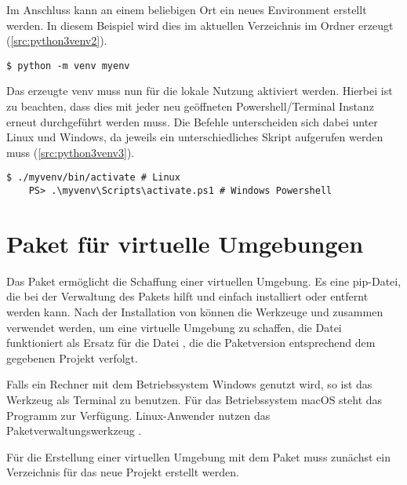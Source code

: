 Im Anschluss kann an einem beliebigen Ort ein neues Environment erstellt werden. In diesem Beispiel wird dies im aktuellen Verzeichnis im Ordner  erzeugt (\cref{src:python3venv2}).

\begin{lstlisting}[language=MyBash, otherkeywords = {python}, caption={Erstellen eines Python VENV}, label={src:python3venv2}]
	$ python -m venv myenv
\end{lstlisting}

Das erzeugte \ac{venv} muss nun für die lokale Nutzung aktiviert werden. Hierbei ist zu beachten, dass dies mit jeder neu geöffneten Powershell/Terminal Instanz erneut durchgeführt werden muss. Die Befehle unterscheiden sich dabei unter Linux und Windows, da jeweils ein unterschiedliches Skript aufgerufen werden muss (\cref{src:python3venv3}).

\begin{lstlisting}[language=MyBash, otherkeywords = {python}, caption={Aktivieren eines Python VENV}, label={src:python3venv3}]
	$ ./myvenv/bin/activate # Linux
	PS> .\myvenv\Scripts\activate.ps1 # Windows Powershell
\end{lstlisting}




\section{Paket  für virtuelle Umgebungen}

Das Paket  ermöglicht die Schaffung einer virtuellen Umgebung. Es eine pip-Datei, die bei der Verwaltung des Pakets hilft und einfach installiert oder entfernt werden kann. Nach der Installation von  können die Werkzeuge  und  zusammen verwendet werden, um eine 
virtuelle Umgebung zu schaffen, die Datei   funktioniert als Ersatz für die Datei , die die Paketversion entsprechend dem gegebenen Projekt verfolgt.

Falls ein Rechner mit dem Betriebssystem Windows genutzt wird, so ist das Werkzeug  als Terminal zu benutzen. Für das Betriebssystem macOS steht das Programm  zur Verfügung. Linux-Anwender nutzen das Paketverwaltungswerkzeug  .

Für die Erstellung einer virtuellen Umgebung mit dem Paket  muss zunächst ein Verzeichnis für das neue Projekt  erstellt werden.

